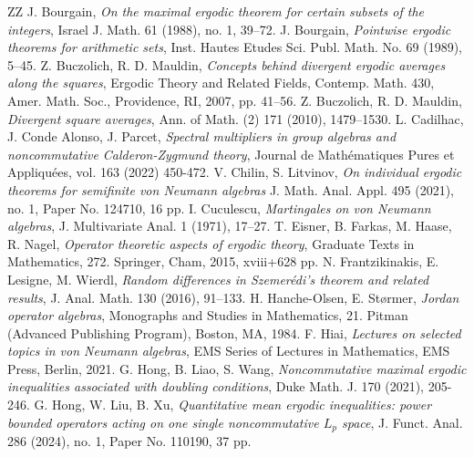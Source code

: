 \documentclass[12pt]{amsart}
\theoremstyle{remark}
\theoremstyle{definition}
\numberwithin{equation}{section}
\begin{document}
\begin{thebibliography}{ZZ}
 J. Bourgain, {\it On the maximal ergodic theorem for certain subsets of the integers},
Israel J. Math. 61 (1988), no. 1, 39–72.
 J. Bourgain, {\it Pointwise ergodic theorems for arithmetic sets}, Inst. Hautes Etudes Sci. Publ. Math. No. 69 (1989), 5–45.
 Z. Buczolich, R. D. Mauldin, {\it Concepts behind divergent ergodic averages along the squares}, Ergodic Theory and Related Fields, Contemp. Math. 430, Amer. Math. Soc., Providence, RI, 2007, pp. 41–56.
 Z. Buczolich,  R. D. Mauldin, {\it Divergent square averages}, Ann. of Math. (2) 171 (2010), 1479–1530.
 L. Cadilhac, J. Conde Alonso, J. Parcet,
{\it Spectral multipliers in group algebras and noncommutative 
Calderon-Zygmund theory}, Journal de Mathématiques Pures et Appliquées, vol. 163 (2022) 450-472. 
 V. Chilin, S. Litvinov, 
{\it On individual ergodic theorems for
semifinite von Neumann algebras} 
J. Math. Anal. Appl. 495 (2021), no. 1, 
Paper No. 124710, 16 pp.
 I. Cuculescu, {\it Martingales on von Neumann algebras}, J. Multivariate Anal. 1 (1971), 17–27.
 T. Eisner, B. Farkas, 
M. Haase, R. Nagel, 
{\it Operator theoretic aspects of ergodic theory}, 
Graduate Texts in Mathematics, 272. 
Springer, Cham, 2015, xviii+628 pp.
 N. Frantzikinakis, 
E. Lesigne, M. Wierdl,
{\it Random differences in Szemerédi's 
theorem and related results},
J. Anal. Math. 130 (2016), 91–133. 
H. Hanche-Olsen, E. St\o rmer, 
{\it Jordan operator algebras}, Monographs 
and Studies in Mathematics, 21. Pitman 
(Advanced Publishing Program), Boston, MA, 1984.
 F. Hiai,  
{\it Lectures on selected topics in von Neumann algebras},
EMS Series of Lectures in Mathematics, EMS Press, Berlin, 2021.
 G. Hong, B. Liao, S. Wang,
{\it Noncommutative maximal ergodic inequalities 
associated with doubling conditions}, 
Duke Math. J. 170 (2021), 205-246.
 G. Hong, W. Liu, B. Xu,
{\it Quantitative mean ergodic inequalities: 
power bounded operators acting on one single 
noncommutative $L_p$ space},
J. Funct. Anal. 286 (2024), no. 1, Paper No. 110190, 37 pp.


\end{thebibliography}
\end{document}

